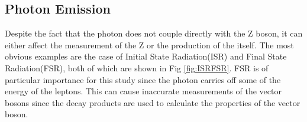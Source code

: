 \subsection{Photon Emission}
\label{sec:StateRad}
Despite the fact that the photon does not couple directly with the Z boson, it can either affect the measurement of the Z or the production of the \Z itself. The most obvious examples are the case of Initial State Radiation(ISR) and Final State Radiation(FSR), both of which are shown in Fig \ref{fig:ISRFSR}. FSR is of particular importance for this study since the photon carries off some of the energy of the leptons. This can cause inaccurate measurements of the vector bosons \bosonpt since the decay products are used to calculate the properties of the vector boson.




%

 
